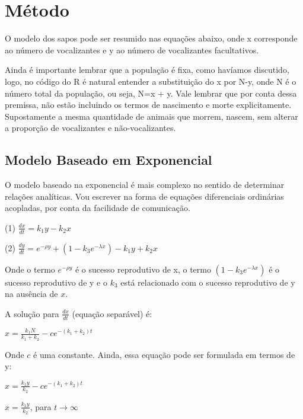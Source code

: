 \section{Método}\label{Metodo}
O modelo dos sapos pode ser resumido nas equações abaixo, onde x corresponde ao número de vocalizantes e y ao número de vocalizantes facultativos.

Ainda é importante lembrar que a população é fixa, como havíamos discutido, logo, no código do R é natural entender a substituição do x por N-y, onde N é o número total da população, ou seja, N=x + y. Vale lembrar que por conta dessa premissa, não estão incluindo os termos de nascimento e morte explicitamente. Supostamente a mesma quantidade de animais que morrem, nascem, sem alterar a proporção de vocalizantes e não-vocalizantes.

\subsection{Modelo Baseado em Exponencial}
O modelo baseado na exponencial é mais complexo no sentido de determinar relações analíticas. Vou escrever na forma de equações diferenciais ordinárias acopladas, por conta da facilidade de comunicação.

\vspace{3 mm}
(1) $\frac{dx}{dt} = k_1 y -k_2 x$

\vspace{3 mm}
(2) $\frac{dy}{dt}= e^{-\rho y} + (1-k_3 e^{-\lambda x}) -k_1 y +k_2 x$
\vspace{3 mm}

Onde o termo $e^{-\rho y}$ é o sucesso reprodutivo de x, o termo $(1-k_3 e^{-\lambda x})$ é o sucesso reprodutivo de y e o $k_3$ está relacionado com o sucesso reprodutivo de y na ausência de $x$.

A solução para $\frac{dx}{dt}$ (equação separável) é:

\vspace{3 mm}
$x=\frac{k_1 N}{k_1 + k_2} - ce^{-(k_1 + k_2)t}$
\vspace{3 mm}

Onde $c$ é uma constante. Ainda, essa equação pode ser formulada em termos de y:

\vspace{3 mm}
$x=\frac{k_1 y}{k_2} - ce^{-(k_1 + k_2)t}$
\vspace{3 mm}

\vspace{3 mm}
$x=\frac{k_1 y}{k_2}$, para $t \rightarrow \infty$
\vspace{3 mm}

